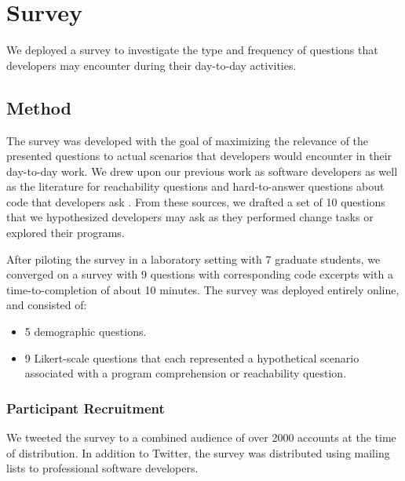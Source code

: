
\chapter{Survey}
\label{ch:Survey}

\noindent We deployed a survey to investigate the type and frequency of
questions that developers may encounter during their day-to-day activities.


\section{Method}
\label{sec:method}

\noindent The survey was developed with the goal of maximizing the relevance of 
the presented questions to actual scenarios that developers would encounter in
their day-to-day work.
We drew upon our previous work as software developers as well as the literature
for reachability questions \cite{latoza-2010-reach} and hard-to-answer
questions about code that developers ask \cite{latoza-2010-hard-questions}.
From these sources, we drafted a set of 10 questions that we hypothesized 
developers may ask as they performed change tasks or explored their programs.

\par After piloting the survey in a laboratory setting with 7 graduate
students, we converged on a survey with 9 questions with corresponding code
excerpts with a time-to-completion of about 10 minutes.
The survey was deployed entirely online, and consisted of:
\begin{itemize}
    \item 5 demographic questions.
    \item 9 Likert-scale questions that each represented a hypothetical 
          scenario associated with a program comprehension or reachability 
          question.
\end{itemize}


\subsection{Participant Recruitment}
\label{subsec:ParticipantRecruitment}

\noindent We tweeted the survey to a combined audience of over 2000
accounts at the time of distribution.
In addition to Twitter, the survey was distributed using mailing lists to
professional software developers.

